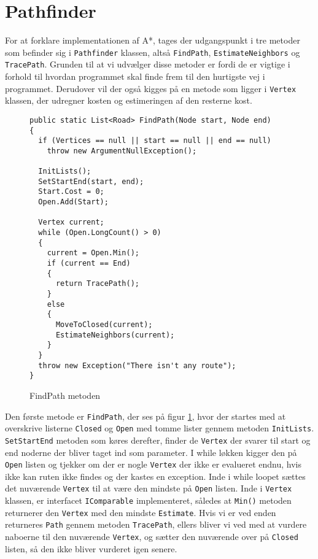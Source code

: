 \section{Pathfinder}\label{Pathfinder}
For at forklare implementationen af A*, tages der udgangspunkt i tre metoder som befinder sig i \texttt{Pathfinder} klassen, altså \texttt{FindPath}, \texttt{EstimateNeighbors} og \texttt{TracePath}. Grunden til at vi udvælger disse metoder er fordi de er vigtige i forhold til hvordan programmet skal finde frem til den hurtigste vej i programmet. Derudover vil der også kigges på en metode som ligger i \texttt{Vertex} klassen, der udregner kosten og estimeringen af den resterne kost.

\begin{figure}[H]
\begin{lstlisting}
public static List<Road> FindPath(Node start, Node end)
{
  if (Vertices == null || start == null || end == null)
    throw new ArgumentNullException();

  InitLists();
  SetStartEnd(start, end);
  Start.Cost = 0;
  Open.Add(Start);

  Vertex current;
  while (Open.LongCount() > 0)
  {
    current = Open.Min();
    if (current == End)
    {
      return TracePath();
    } 
    else
    {
      MoveToClosed(current);
      EstimateNeighbors(current);
    }
  }
  throw new Exception("There isn't any route");
}
\end{lstlisting}
\caption{FindPath metoden}\label{FindPathCode}
\end{figure}

Den første metode er \texttt{FindPath}, der ses på figur \ref{FindPathCode}, hvor der startes med at overskrive listerne \texttt{Closed} og \texttt{Open} med tomme lister gennem metoden \texttt{InitLists}. \texttt{SetStartEnd} metoden som køres derefter, finder de \texttt{Vertex} der svarer til start og end noderne der bliver taget ind som parameter. I while løkken kigger den på \texttt{Open} listen og tjekker om der er nogle \texttt{Vertex} der ikke er evalueret endnu, hvis ikke kan ruten ikke findes og der kastes en exception. Inde i while loopet sættes det nuværende \texttt{Vertex} til at være den mindste på \texttt{Open} listen. Inde i \texttt{Vertex} klassen, er interfacet \texttt{IComparable} implementeret, således at \texttt{Min()} metoden returnerer den \texttt{Vertex} med den mindste \texttt{Estimate}. Hvis vi er ved enden returneres \texttt{Path} gennem metoden \texttt{TracePath}, ellers bliver vi ved med at vurdere naboerne til den nuværende \texttt{Vertex}, og sætter den nuværende over på \texttt{Closed} listen, så den ikke bliver vurderet igen senere.

